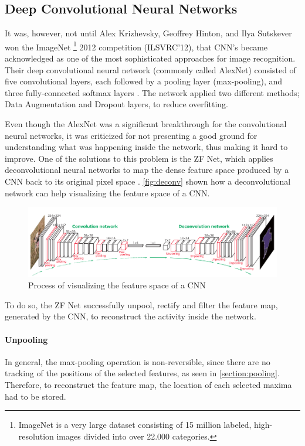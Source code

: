 \subsection{Deep Convolutional Neural Networks}
It was, however, not until Alex Krizhevsky, Geoffrey Hinton, and Ilya Sutskever won the ImageNet \footnote{ImageNet is a very large dataset consisting of 15 million labeled, high-resolution images divided into over 22.000 categories.} 2012 competition (ILSVRC'12), that CNN's became acknowledged as one of the most sophisticated approaches for image recognition. Their deep convolutional neural network (commonly called AlexNet) consisted of five convolutional layers, each followed by a pooling layer (max-pooling), and three fully-connected softmax layers \citep{Krizhevsky2012}. The network applied two different methods; Data Augmentation and Dropout layers, to reduce overfitting.

Even though the AlexNet was a significant breakthrough for the convolutional neural networks, it was criticized for not presenting a good ground for understanding what was happening inside the network, thus making it hard to improve. One of the solutions to this problem is the ZF Net, which applies deconvolutional neural networks \citep{Zeiler2011} to map the dense feature space produced by a CNN back to its original pixel space \citep{Zeiler2014}. \autoref{fig:deconv} shown how a deconvolutional network can help visualizing the feature space of a CNN.

\begin{figure}[!h]
	\centering
	\includegraphics[scale=0.5]{fig/deconv.png}
	\caption{Process of visualizing the feature space of a CNN \citep{Noh2015}}
	\label{fig:deconv}
\end{figure}

To do so, the ZF Net successfully unpool, rectify and filter the feature map, generated by the CNN, to reconstruct the activity inside the network. 

\paragraph{Unpooling} In general, the max-pooling operation is non-reversible, since there are no tracking of the positions of the selected features, as seen in \autoref{section:pooling}. Therefore, to reconstruct the feature map, the location of each selected maxima had to be stored.

